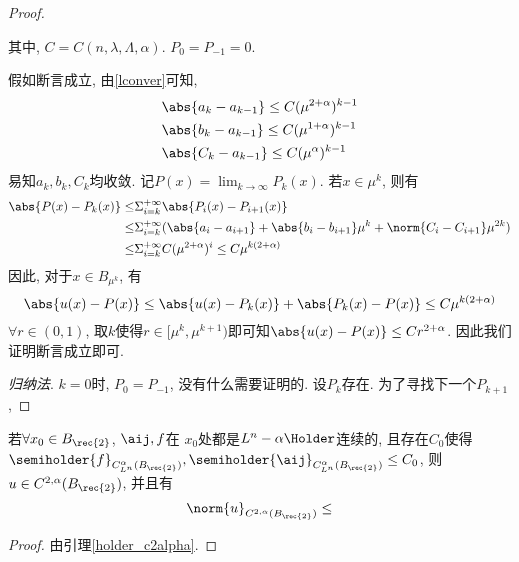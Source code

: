 \begin{proof}
\begin{claim}
\begin{enumerate}
        \end{enumerate}
    \end{claim}
    其中, $C=C(n, \lambda, \Lambda, \alpha)$.  $P_0=P_{-1}=0$.  
    \par 假如断言成立, 由\eqref{lconver}可知, 
    \begin{align}
        &\abs{a_k-a_{k-1}} \le C(\mu^{2+\alpha})^{k-1} \\
        &\abs{b_k-a_{k-1}} \le C(\mu^{1+\alpha})^{k-1} \\
        &\abs{C_k-a_{k-1}} \le C(\mu^{\alpha})^{k-1} \\
    \end{align}
    易知$a_k, b_k, C_k$均收敛.  记$P(x)=\lim_{k\to \infty}P_k(x)$.  若$x \in \mu^k$, 则有
    \begin{equation}
        \begin{split}
            \abs{P(x)-P_k(x)} \le& \Sigma^{+\infty}_{i=k}\abs{P_i(x)-P_{i+1}(x)} \\
            \le & \Sigma_{i=k}^{+\infty} (\abs{a_i-a_{i+1}}+\abs{b_i-b_{i+1}}\mu^k+\norm{C_i-C_{i+1}}\mu^{2k}) \\
            \le & \Sigma^{+\infty}_{i=k}C(\mu^{2+\alpha})^i\le C\mu^{k(2+\alpha)}
        \end{split}
    \end{equation}
    因此, 对于$x \in B_{\mu^k}$, 有 
    \begin{equation}
        \abs{u(x)-P(x)} \le \abs{u(x)-P_k(x)}+\abs{P_k(x)-P(x)} \le C\mu^{k(2+\alpha)}
    \end{equation}
    $\forall r \in (0, 1)$, 取$k$使得$r \in [\mu^k, \mu^{k+1})$即可知$\abs{u(x)-P(x)} \le Cr^{2+\alpha}$.  因此我们证明断言成立即可.  
    \par \textit{归纳法}.  $k=0$时, $P_0=P_{-1}$, 没有什么需要证明的.  设$P_k$存在.  为了寻找下一个$P_{k+1}$, 
\end{proof}
\begin{corollary}
    若$\forall x_0 \in B_{\rec{2}}$, $\aij, f$在 $x_0$处都是$L^n-\alpha\Holder$连续的, 且存在$C_0$使得${\semiholder{f}_{C^\alpha_{L^n}(B_\rec{2})}}, {\semiholder{\aij}_{C^\alpha_{L^n}(B_\rec{2})}} \le C_0$, 则$u \in C^{2, \alpha}(B_\rec{2})$, 并且有
    \begin{equation}
        \norm{u}_{C^{2, \alpha}(B_\rec{2})} \le 
    \end{equation}
\end{corollary}
\begin{proof}
    由引理\eqref{holder_c2alpha}.  
\end{proof}
